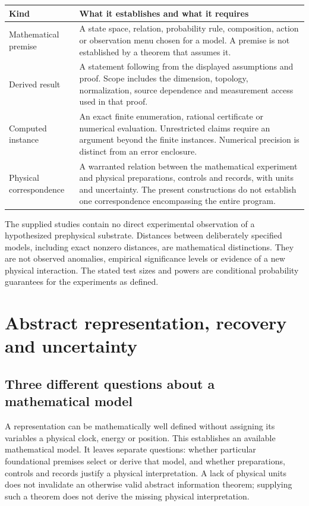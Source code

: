 \begin{longtable}{@{}>{\raggedright\arraybackslash}p{}p{}@{}}
\toprule
Kind & What it establishes and what it requires\\
\midrule
\endhead
Mathematical premise &
A state space, relation, probability rule, composition, action or observation menu chosen for a model. A premise is not established by a theorem that assumes it.\\
Derived result &
A statement following from the displayed assumptions and proof. Scope includes the dimension, topology, normalization, source dependence and measurement access used in that proof.\\
Computed instance &
An exact finite enumeration, rational certificate or numerical evaluation. Unrestricted claims require an argument beyond the finite instances. Numerical precision is distinct from an error enclosure.\\
Physical correspondence &
A warranted relation between the mathematical experiment and physical preparations, controls and records, with units and uncertainty. The present constructions do not establish one correspondence encompassing the entire program.\\
\bottomrule
\end{longtable}

The supplied studies contain no direct experimental observation of a hypothesized prephysical substrate. Distances between deliberately specified models, including exact nonzero distances, are mathematical distinctions. They are not observed anomalies, empirical significance levels or evidence of a new physical interaction. The stated test sizes and powers are conditional probability guarantees for the experiments as defined.

\section{Abstract representation, recovery and uncertainty}
\label{col:representation}

\subsection{Three different questions about a mathematical model}

A representation can be mathematically well defined without assigning its variables a physical clock, energy or position. This establishes an available mathematical model. It leaves separate questions: whether particular foundational premises select or derive that model, and whether preparations, controls and records justify a physical interpretation. A lack of physical units does not invalidate an otherwise valid abstract information theorem; supplying such a theorem does not derive the missing physical interpretation.

